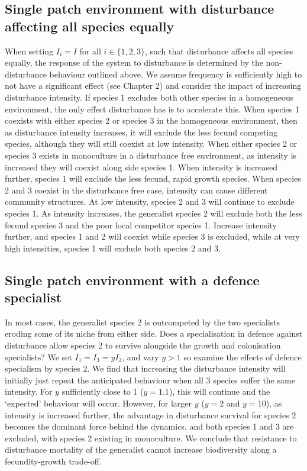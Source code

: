 \subsection{Single patch environment with disturbance affecting all species equally} \label{ss:homo}
When setting $I_i=I$ for all $i \in \{1,2,3\}$, such that disturbance affects all species equally, the response of the system to disturbance is determined by the non-disturbance behaviour outlined above. We assume frequency is sufficiently high to not have a significant effect (see Chapter 2) and consider the impact of increasing disturbance intensity. If species 1 excludes both other species in a homogeneous environment, the only effect disturbance has is to accelerate this. When species 1 coexists with either species 2 or species 3 in the homogeneous environment, then as disturbance intensity increases, it will exclude the less fecund competing species, although they will still coexist at low intensity. When either species 2 or species 3 exists in monoculture in a disturbance free environment, as intensity is increased they will coexist along side species 1. When intensity is increased further, species 1 will exclude the less fecund, rapid growth species. When species 2 and 3 coexist in the disturbance free case, intensity can cause different community structures. At low intensity, species 2 and 3 will continue to exclude species 1. As intensity increases, the generalist species 2 will exclude both the less fecund species 3 and the poor local competitor species 1. Increase intensity further, and species 1 and 2 will coexist while species 3 is excluded, while at very high intensities, species 1 will exclude both species 2 and 3.

\subsection{Single patch environment with a defence specialist}
In most cases, the generalist species 2 is outcompeted by the two specialists eroding some of its niche from either side. Does a specialisation in defence against disturbance allow species 2 to survive alongside the growth and colonisation specialists? We set $I_1=I_3=yI_2$, and vary $y>1$ so examine the effects of defence specialism by species 2. We find that increasing the disturbance intensity will initially just repeat the anticipated behaviour when all 3 species suffer the same intensity. For $y$ sufficiently close to 1 ($y=1.1$), this will continue and the `expected' behaviour will occur. However, for larger $y$ ($y=2$ and $y=10$), as intensity is increased further, the advantage in disturbance survival for species 2 becomes the dominant force behind the dynamics, and both species 1 and 3 are excluded, with species 2 existing in monoculture. We conclude that resistance to disturbance mortality of the generalist cannot increase biodiversity along a fecundity-growth trade-off.

